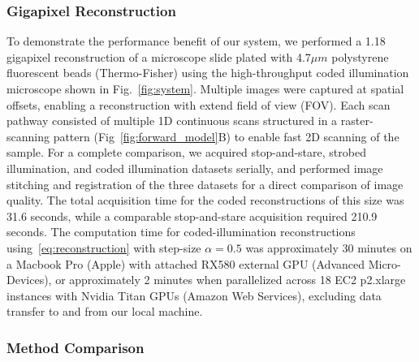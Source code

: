 \subsubsection{Gigapixel Reconstruction}
To demonstrate the performance benefit of our system, we performed a 1.18 gigapixel reconstruction of a microscope slide plated with 4.7$\mu m$ polystyrene fluorescent beads (Thermo-Fisher) using the high-throughput coded illumination microscope shown in Fig.~\ref{fig:system}. Multiple images were captured at spatial offsets, enabling a reconstruction with extend field of view (FOV). Each scan pathway consisted of multiple 1D continuous scans structured in a raster-scanning pattern (Fig~\ref{fig:forward_model}{B}) to enable fast 2D scanning of the sample. For a complete comparison, we acquired stop-and-stare, strobed illumination, and coded illumination datasets serially, and performed image stitching and registration of the three datasets for a direct comparison of image quality. The total acquisition time for the coded reconstructions of this size was 31.6 seconds, while a comparable stop-and-stare acquisition required 210.9 seconds. The computation time for coded-illumination reconstructions using~\eqref{eq:reconstruction} with step-size $\alpha=0.5$ was approximately 30 minutes on a Macbook Pro (Apple) with attached RX580 external GPU (Advanced Micro-Devices), or approximately 2 minutes when parallelized across 18 EC2 p2.xlarge instances with Nvidia Titan GPUs (Amazon Web Services), excluding data transfer to and from our local machine.

\subsubsection{Method Comparison}\label{sec:highthroughput:method_comparison}

